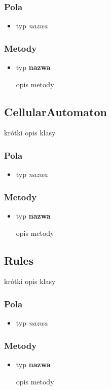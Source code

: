 \documentclass[a4paper,11pt]{article}
\begin{document}
\subsubsection{Pola}
\begin{itemize}
\item typ  \textit{nazwa}
\end{itemize}
\subsubsection{Metody}
\begin{itemize}
\item typ  \textbf{nazwa}

opis metody
\end{itemize}






\subsection{CellularAutomaton}
krótki opis klasy
\subsubsection{Pola}
\begin{itemize}
\item typ  \textit{nazwa}
\end{itemize}
\subsubsection{Metody}
\begin{itemize}
\item typ  \textbf{nazwa}

opis metody
\end{itemize}




\subsection{Rules}
krótki opis klasy
\subsubsection{Pola}
\begin{itemize}
\item typ  \textit{nazwa}
\end{itemize}
\subsubsection{Metody}
\begin{itemize}
\item typ  \textbf{nazwa}

opis metody
\end{itemize}
\end{document}
